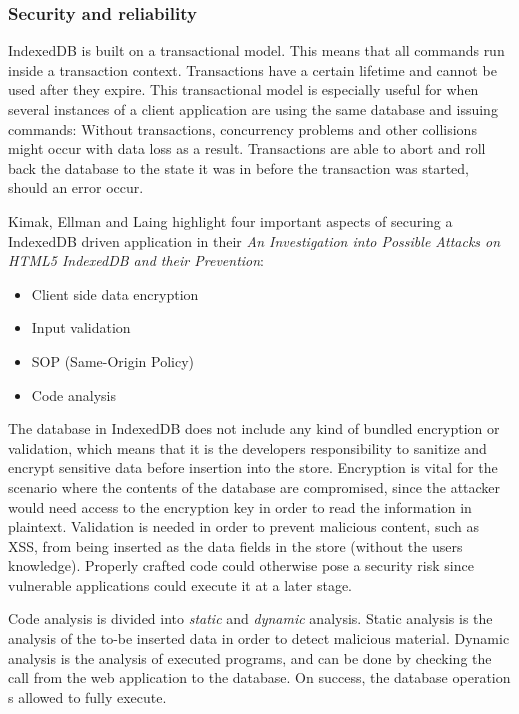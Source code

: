 \subsubsection{Security and reliability}
\label{subsec:security}
IndexedDB is built on a transactional model. This means that all commands run inside a transaction context. Transactions have a certain lifetime and cannot be used after they expire. This transactional model is especially useful for when several instances of a client application are using the same database and issuing commands: Without transactions, concurrency problems and other collisions might occur with data loss as a result. Transactions are able to abort and roll back the database to the state it was in before the transaction was started, should an error occur.

Kimak, Ellman and Laing highlight four important aspects of securing a IndexedDB driven application in their \emph{An Investigation into Possible Attacks on HTML5 IndexedDB and their Prevention}\cite{IndexedDBSecurity:2012:Online}:

\begin{itemize}
  \item Client side data encryption
  \item Input validation
  \item SOP (Same-Origin Policy)
  \item Code analysis
\end{itemize}

The database in IndexedDB does not include any kind of bundled encryption or validation, which means that it is the developers responsibility to sanitize and encrypt sensitive data before insertion into the store. Encryption is vital for the scenario where the contents of the database are compromised, since the attacker would need access to the encryption key in order to read the information in plaintext. Validation is needed in order to prevent malicious content, such as XSS, from being inserted as the data fields in the store (without the users knowledge). Properly crafted code could otherwise pose a security risk since vulnerable applications could execute it at a later stage.

Code analysis is divided into \emph{static} and \emph{dynamic} analysis. Static analysis is the analysis of the to-be inserted data in order to detect malicious material. Dynamic analysis is the analysis of executed programs, and can be done by checking the call from the web application to the database. On success, the database operation s allowed to fully execute\cite{IndexedDBSecurity:2012:Online}.

